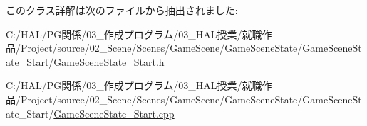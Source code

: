 このクラス詳解は次のファイルから抽出されました\+:\begin{DoxyCompactItemize}
\item 
C\+:/\+H\+A\+L/\+P\+G関係/03\+\_\+作成プログラム/03\+\_\+\+H\+A\+L授業/就職作品/\+Project/source/02\+\_\+\+Scene/\+Scenes/\+Game\+Scene/\+Game\+Scene\+State/\+Game\+Scene\+State\+\_\+\+Start/\mbox{\hyperlink{_game_scene_state___start_8h}{Game\+Scene\+State\+\_\+\+Start.\+h}}\item 
C\+:/\+H\+A\+L/\+P\+G関係/03\+\_\+作成プログラム/03\+\_\+\+H\+A\+L授業/就職作品/\+Project/source/02\+\_\+\+Scene/\+Scenes/\+Game\+Scene/\+Game\+Scene\+State/\+Game\+Scene\+State\+\_\+\+Start/\mbox{\hyperlink{_game_scene_state___start_8cpp}{Game\+Scene\+State\+\_\+\+Start.\+cpp}}\end{DoxyCompactItemize}
